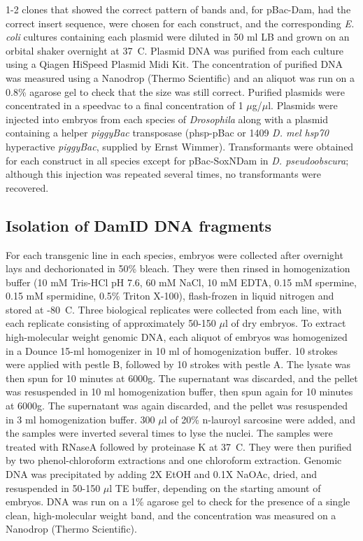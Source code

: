 1-2 clones that showed the correct pattern of bands and, for pBac-Dam, had the correct insert sequence, were chosen for each construct, and the corresponding \emph{E. coli} cultures containing each plasmid were diluted in 50 ml LB and grown on an orbital shaker overnight at 37\degree~C. Plasmid DNA was purified from each culture using a Qiagen HiSpeed Plasmid Midi Kit. The concentration of purified DNA was measured using a Nanodrop (Thermo Scientific) and an aliquot was run on a 0.8\% agarose gel to check that the size was still correct. Purified plasmids were concentrated in a speedvac to a final concentration of 1 \(\mu\)g/\(\mu\)l. Plasmids were injected into embryos from each species of \emph{Drosophila} along with a plasmid containing a helper \emph{piggyBac} transposase (phsp-pBac or 1409 \emph{D. mel hsp70} hyperactive \emph{piggyBac}, supplied by Ernst Wimmer). Transformants were obtained for each construct in all species except for pBac-SoxNDam in \emph{D. pseudoobscura}; although this injection was repeated several times, no transformants were recovered.

\subsection{Isolation of DamID DNA fragments}
For each transgenic line in each species, embryos were collected after overnight lays and dechorionated in 50\% bleach. They were then rinsed in homogenization buffer (10 mM Tris-HCl pH 7.6, 60 mM NaCl, 10 mM EDTA, 0.15 mM spermine, 0.15 mM spermidine, 0.5\% Triton X-100), flash-frozen in liquid nitrogen and stored at -80\degree~C. Three biological replicates were collected from each line, with each replicate consisting of approximately 50-150 \(\mu\)l of dry embryos. To extract high-molecular weight genomic DNA, each aliquot of embryos was homogenized in a Dounce 15-ml homogenizer in 10 ml of homogenization buffer. 10 strokes were applied with pestle B, followed by 10 strokes with pestle A. The lysate was then spun for 10 minutes at 6000g. The supernatant was discarded, and the pellet was resuspended in 10 ml homogenization buffer, then spun again for 10 minutes at 6000g. The supernatant was again discarded, and the pellet was resuspended in 3 ml homogenization buffer. 300 \(\mu\)l of 20\% n-lauroyl sarcosine were added, and the samples were inverted several times to lyse the nuclei. The samples were treated with RNaseA followed by proteinase K at 37\degree~C. They were then purified by two phenol-chloroform extractions and one chloroform extraction. Genomic DNA was precipitated by adding 2X EtOH and 0.1X NaOAc, dried, and resuspended in 50-150 \(\mu\)l TE buffer, depending on the starting amount of embryos. DNA was run on a 1\% agarose gel to check for the presence of a single clean, high-molecular weight band, and the concentration was measured on a Nanodrop (Thermo Scientific).\\


